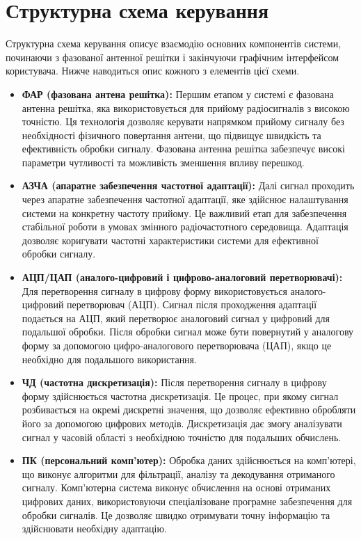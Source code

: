 \documentclass[a4paper]{article}
\begin{document}
\section*{Структурна схема керування}

Структурна схема керування описує взаємодію основних компонентів системи, починаючи з фазованої антенної решітки і закінчуючи графічним інтерфейсом користувача. Нижче наводиться опис кожного з елементів цієї схеми.

\begin{itemize}
    \item \textbf{ФАР (фазована антена решітка):} 
    Першим етапом у системі є фазована антенна решітка, яка використовується для прийому радіосигналів з високою точністю. Ця технологія дозволяє керувати напрямком прийому сигналу без необхідності фізичного повертання антени, що підвищує швидкість та ефективність обробки сигналу. Фазована антенна решітка забезпечує високі параметри чутливості та можливість зменшення впливу перешкод.
    
    \item \textbf{АЗЧА (апаратне забезпечення частотної адаптації):} 
    Далі сигнал проходить через апаратне забезпечення частотної адаптації, яке здійснює налаштування системи на конкретну частоту прийому. Це важливий етап для забезпечення стабільної роботи в умовах змінного радіочастотного середовища. Адаптація дозволяє коригувати частотні характеристики системи для ефективної обробки сигналу.
    
    \item \textbf{АЦП/ЦАП (аналого-цифровий і цифрово-аналоговий перетворювачі):} 
    Для перетворення сигналу в цифрову форму використовується аналого-цифровий перетворювач (АЦП). Сигнал після проходження адаптації подається на АЦП, який перетворює аналоговий сигнал у цифровий для подальшої обробки. Після обробки сигнал може бути повернутий у аналогову форму за допомогою цифро-аналогового перетворювача (ЦАП), якщо це необхідно для подальшого використання.
    
    \item \textbf{ЧД (частотна дискретизація):} 
    Після перетворення сигналу в цифрову форму здійснюється частотна дискретизація. Це процес, при якому сигнал розбивається на окремі дискретні значення, що дозволяє ефективно обробляти його за допомогою цифрових методів. Дискретизація дає змогу аналізувати сигнал у часовій області з необхідною точністю для подальших обчислень.
    
    \item \textbf{ПК (персональний комп'ютер):} 
    Обробка даних здійснюється на комп'ютері, що виконує алгоритми для фільтрації, аналізу та декодування отриманого сигналу. Комп'ютерна система виконує обчислення на основі отриманих цифрових даних, використовуючи спеціалізоване програмне забезпечення для обробки сигналів. Це дозволяє швидко отримувати точну інформацію та здійснювати необхідну адаптацію.
    

\end{itemize}
\end{document}
